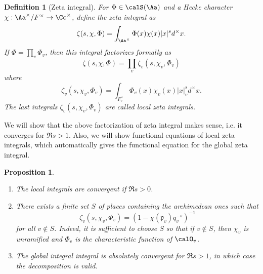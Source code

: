 \documentclass{article}
\newtheorem{definition}{Definition}[section]
\newtheorem{proposition}{Proposition}[section]
\begin{document}
\begin{definition}[Zeta integral]
For $\Phi\in \calS(\Aa)$ and a Hecke character $\chi:\Aa^{\times}/F^{\times} \to \Cc^{\times}$, define the zeta integral as
$$
\zeta(s, \chi, \Phi) = \int_{\Aa^{\times}} \Phi(x) \chi(x) |x|^{s} d^{\times}x. 
$$
If $\Phi = \prod_{v}\Phi_{v}$, then this integral factorizes formally as
$$
\zeta(s, \chi, \Phi) = \prod_{v} \zeta_{v}(s, \chi_{v}, \Phi_{v})
$$
where 
$$
\zeta_{v}(s, \chi_{v}, \Phi_{v}) = \int_{F_{v}^{\times}} \Phi_{v}(x)\chi_{v}(x)|x|_{v}^{s}d^{\times}x.
$$
The last integrals $\zeta_{v}(s, \chi_{v}, \Phi_{v})$ are called local zeta integrals. 
\end{definition}
We will show that the above factorization of zeta integral makes sense, i.e. it converges for $\Re s >1$. 
Also, we will show functional equations of local zeta integrals, which automatically gives the functional equation for the global zeta integral. 
\begin{proposition}
\begin{enumerate}
\item The local integrals are convergent if $\Re s >0$. 
\item There exists a finite set $S$ of places containing the archimedean ones such that 
$$
\zeta_{v}(s, \chi_{v}, \Phi_{v}) = (1-\chi(\mathfrak{p}_{v}) q_{v}^{-s})^{-1}
$$
for all $v\not\in S$. 
Indeed, it is sufficient to choose $S$ so that if $v\not\in S$, then $\chi_{v}$ is unramified and $\Phi_{v}$ is the characteristic function of $\calO_{v}$. 
\item The global integral integral is absolutely convergent for $\Re s >1$, in which case the decomposition is valid. 
\end{enumerate}
\end{proposition}
\end{document}
